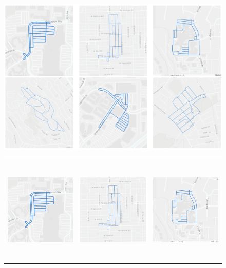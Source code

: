 \begin{figure}[t]
  \begin{center}
  \iflatexml
  \includegraphics[width=6\textwidth]{figs/example_graphs.png}
  \else
  \begin{tabular}{lll}
    \includegraphics[height=5.1cm,trim={0.2cm 0 0.4cm 0},clip]{figs/graph1.png} &
    \includegraphics[height=5.1cm,trim={0.2cm 0 0.4cm 0},clip]{figs/graph2.png} &
    \includegraphics[height=5.1cm,trim={0.2cm 0 0.4cm 0},clip]{figs/graph3.png} \\

\end{tabular}
\end{center}
\end{figure}

